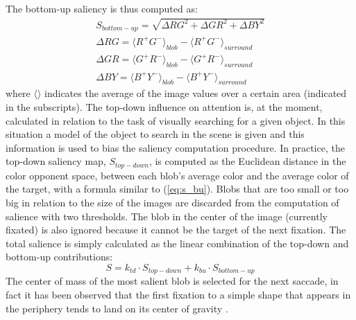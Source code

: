 \documentclass{llncs}
\begin{document}
The bottom-up saliency is thus computed as:
\begin{eqnarray}
	S_{bottom-up}=\sqrt{\Delta RG^2 + \Delta GR^2+ \Delta BY^2} \\
	\Delta RG={\langle R^+G^- \rangle}_{blob} - {\langle R^+G^- \rangle}_{surround} \nonumber \\
	\Delta GR={\langle G^+R^- \rangle}_{blob} - {\langle G^+R^- \rangle}_{surround} \nonumber\\
	\Delta BY={\langle B^+Y^- \rangle}_{blob} - {\langle B^+Y^- \rangle}_{surround} \nonumber
	\label{eq:s_bu}
\end{eqnarray}
\noindent where $\langle \rangle$ indicates the average of the image values
over a certain area (indicated in the subscripts).
The top-down influence on attention is, at the
moment, calculated in relation to the task of visually
searching for a given object. In this situation a model of
the object to search in the scene is given and this information is used to bias the saliency
computation procedure. In practice, the top-down
saliency map, $S_{top-down}$, is computed as the Euclidean distance in
the color opponent space, between each blob's average
color and the average color of the target, with a formula
similar to (\ref{eq:s_bu}).
Blobs that are too small or too big in relation to the
size of the images are discarded from the
computation of salience with two thresholds. The blob in
the center of the image (currently fixated) is also ignored
because it cannot be the target of the next fixation.
The total salience is simply calculated as the linear
combination of the top-down and bottom-up
contributions:
\begin{equation}
	S=k_{td} \cdot S_{top-down}+k_{bu} \cdot S_{bottom-up}
	\label{eq:s_tot}
\end{equation}
The center of mass of the most salient blob is selected for the next
saccade, in fact it has been observed that the first
fixation to a simple shape that appears in the periphery
tends to land on its center of gravity \cite{MelcherK99}.
\end{document}
